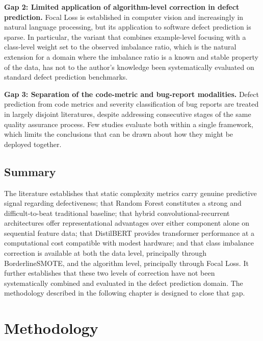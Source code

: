 \documentclass[12pt,a4paper,oneside]{report}
\begin{document}
\textbf{Gap 2: Limited application of algorithm-level correction in defect prediction.} Focal Loss is established in computer vision and increasingly in natural language processing, but its application to software defect prediction is sparse. In particular, the variant that combines example-level focusing with a class-level weight set to the observed imbalance ratio, which is the natural extension for a domain where the imbalance ratio is a known and stable property of the data, has not to the author's knowledge been systematically evaluated on standard defect prediction benchmarks.

\textbf{Gap 3: Separation of the code-metric and bug-report modalities.} Defect prediction from code metrics and severity classification of bug reports are treated in largely disjoint literatures, despite addressing consecutive stages of the same quality assurance process. Few studies evaluate both within a single framework, which limits the conclusions that can be drawn about how they might be deployed together.

\section{Summary}

The literature establishes that static complexity metrics carry genuine predictive signal regarding defectiveness; that Random Forest constitutes a strong and difficult-to-beat traditional baseline; that hybrid convolutional-recurrent architectures offer representational advantages over either component alone on sequential feature data; that DistilBERT provides transformer performance at a computational cost compatible with modest hardware; and that class imbalance correction is available at both the data level, principally through BorderlineSMOTE, and the algorithm level, principally through Focal Loss. It further establishes that these two levels of correction have not been systematically combined and evaluated in the defect prediction domain. The methodology described in the following chapter is designed to close that gap.

\clearpage

\chapter{Methodology}
\end{document}
